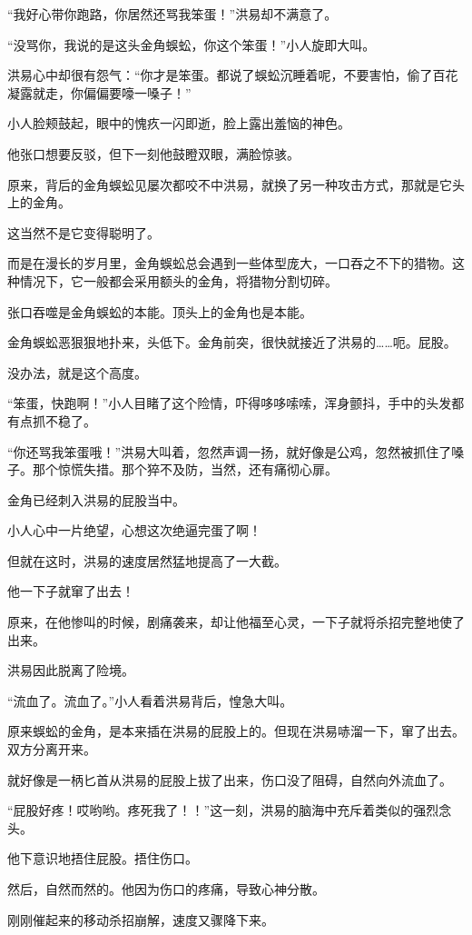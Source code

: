 \begin{this_body}
“我好心带你跑路，你居然还骂我笨蛋！”洪易却不满意了。

“没骂你，我说的是这头金角蜈蚣，你这个笨蛋！”小人旋即大叫。

洪易心中却很有怨气：“你才是笨蛋。都说了蜈蚣沉睡着呢，不要害怕，偷了百花凝露就走，你偏偏要嚎一嗓子！”

小人脸颊鼓起，眼中的愧疚一闪即逝，脸上露出羞恼的神色。

他张口想要反驳，但下一刻他鼓瞪双眼，满脸惊骇。

原来，背后的金角蜈蚣见屡次都咬不中洪易，就换了另一种攻击方式，那就是它头上的金角。

这当然不是它变得聪明了。

而是在漫长的岁月里，金角蜈蚣总会遇到一些体型庞大，一口吞之不下的猎物。这种情况下，它一般都会采用额头的金角，将猎物分割切碎。

张口吞噬是金角蜈蚣的本能。顶头上的金角也是本能。

金角蜈蚣恶狠狠地扑来，头低下。金角前突，很快就接近了洪易的……呃。屁股。

没办法，就是这个高度。

“笨蛋，快跑啊！”小人目睹了这个险情，吓得哆哆嗦嗦，浑身颤抖，手中的头发都有点抓不稳了。

“你还骂我笨蛋哦！”洪易大叫着，忽然声调一扬，就好像是公鸡，忽然被抓住了嗓子。那个惊慌失措。那个猝不及防，当然，还有痛彻心扉。

金角已经刺入洪易的屁股当中。

小人心中一片绝望，心想这次绝逼完蛋了啊！

但就在这时，洪易的速度居然猛地提高了一大截。

他一下子就窜了出去！

原来，在他惨叫的时候，剧痛袭来，却让他福至心灵，一下子就将杀招完整地使了出来。

洪易因此脱离了险境。

“流血了。流血了。”小人看着洪易背后，惶急大叫。

原来蜈蚣的金角，是本来插在洪易的屁股上的。但现在洪易哧溜一下，窜了出去。双方分离开来。

就好像是一柄匕首从洪易的屁股上拔了出来，伤口没了阻碍，自然向外流血了。

“屁股好疼！哎哟哟。疼死我了！！”这一刻，洪易的脑海中充斥着类似的强烈念头。

他下意识地捂住屁股。捂住伤口。

然后，自然而然的。他因为伤口的疼痛，导致心神分散。

刚刚催起来的移动杀招崩解，速度又骤降下来。


\end{this_body}
